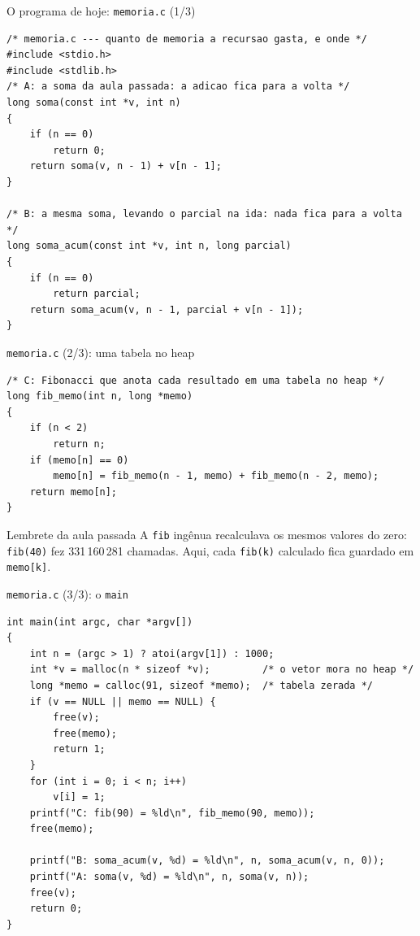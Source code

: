 \documentclass[aspectratio=169]{beamer}
\begin{document}
\begin{frame}[fragile]{O programa de hoje: \texttt{memoria.c} (1/3)}
\begin{lstlisting}[style=codC]
/* memoria.c --- quanto de memoria a recursao gasta, e onde */
#include <stdio.h>
#include <stdlib.h>
/* A: a soma da aula passada: a adicao fica para a volta */
long soma(const int *v, int n)
{
    if (n == 0)
        return 0;
    return soma(v, n - 1) + v[n - 1];
}

/* B: a mesma soma, levando o parcial na ida: nada fica para a volta */
long soma_acum(const int *v, int n, long parcial)
{
    if (n == 0)
        return parcial;
    return soma_acum(v, n - 1, parcial + v[n - 1]);
}
\end{lstlisting}
\end{frame}

\begin{frame}[fragile]{\texttt{memoria.c} (2/3): uma tabela no heap}
\begin{lstlisting}[style=codC]
/* C: Fibonacci que anota cada resultado em uma tabela no heap */
long fib_memo(int n, long *memo)
{
    if (n < 2)
        return n;
    if (memo[n] == 0)
        memo[n] = fib_memo(n - 1, memo) + fib_memo(n - 2, memo);
    return memo[n];
}
\end{lstlisting}
  \begin{block}{Lembrete da aula passada}
    \small A \texttt{fib} ingênua recalculava os mesmos valores do zero:
    \texttt{fib(40)} fez 331\,160\,281 chamadas. Aqui, cada \texttt{fib(k)}
    calculado fica guardado em \texttt{memo[k]}.
  \end{block}
\end{frame}

\begin{frame}[fragile]{\texttt{memoria.c} (3/3): o \texttt{main}}
\begin{lstlisting}[style=codC, basicstyle=\ttfamily\fontsize{7}{7.9}\selectfont]
int main(int argc, char *argv[])
{
    int n = (argc > 1) ? atoi(argv[1]) : 1000;
    int *v = malloc(n * sizeof *v);         /* o vetor mora no heap */
    long *memo = calloc(91, sizeof *memo);  /* tabela zerada */
    if (v == NULL || memo == NULL) {
        free(v);
        free(memo);
        return 1;
    }
    for (int i = 0; i < n; i++)
        v[i] = 1;
    printf("C: fib(90) = %ld\n", fib_memo(90, memo));
    free(memo);

    printf("B: soma_acum(v, %d) = %ld\n", n, soma_acum(v, n, 0));
    printf("A: soma(v, %d) = %ld\n", n, soma(v, n));
    free(v);
    return 0;
}
\end{lstlisting}
\end{frame}
\end{document}
